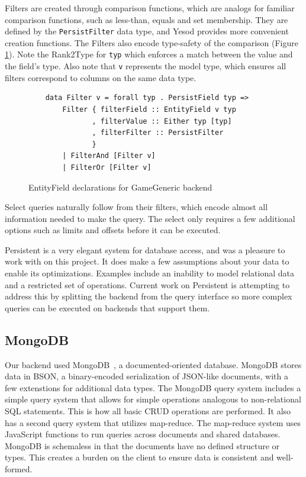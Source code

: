 \documentclass{chi2009}
\newcommand{\code}[1]{\texttt{#1}}
\begin{document}
Filters are created through comparison functions, which are analogs for familiar comparison functions, such as less-than, equals and set membership.  They are defined by the \code{PersistFilter} data type, and Yesod provides more convenient creation functions.  The Filters also encode type-safety of the comparison (Figure \ref{Filter}).  Note the Rank2Type for \code{typ} which enforces a match between the value and the field's type.  Also note that \code{v} represents the model type, which ensures all filters correspond to columns on the same data type.
\begin{figure}[]
\begin{verbatim}
    data Filter v = forall typ . PersistField typ => 
        Filter { filterField :: EntityField v typ
               , filterValue :: Either typ [typ]
               , filterFilter :: PersistFilter
               }
        | FilterAnd [Filter v]
        | FilterOr [Filter v]
\end{verbatim}
    \caption{EntityField declarations for GameGeneric backend}
    \label{Filter}
\end{figure}
Select queries naturally follow from their filters, which encode almost all information needed to make the query.  The select only requires a few additional options such as limits and offsets before it can be executed.

Persistent is a very elegant system for database access, and was a pleasure to work with on this project.  It does make a few assumptions about your data to enable its optimizations.  Examples include an inability to model relational data and a restricted set of operations.  Current work on Persistent is attempting to address this by splitting the backend from the query interface so more complex queries can be executed on backends that support them.

\subsection{MongoDB}

Our backend used MongoDB~\cite{mongo}, a documented-oriented database. MongoDB stores data in BSON, a binary-encoded serialization of JSON-like documents, with a few extenstions for additional data types.  The MongoDB query system includes a simple query system that allows for simple operations analogous to non-relational SQL statements.  This is how all basic CRUD operations are performed.  It also has a second query system that utilizes map-reduce.  The map-reduce system uses JavaScript functions to run queries across documents and shared databases.  MongoDB is schemaless in that the documents have no defined structure or types.  This creates a burden on the client to ensure data is consistent and well-formed.
\end{document}
